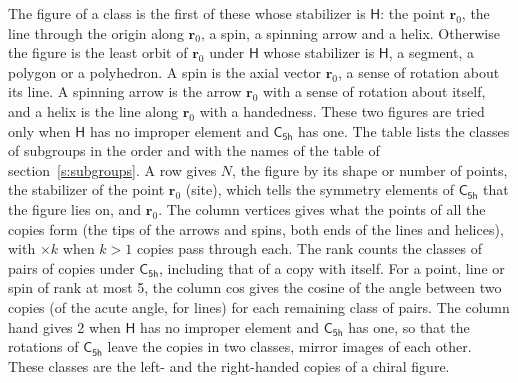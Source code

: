 \documentclass[10pt,a4paper]{article}
\numberwithin{equation}{section}
\newcommand{\grp}[1]{\mathsf{#1}}
\newcommand{\pointr}{\mathbf{r}}
\begin{document}
\leavevmode\label{n:head.figure}The figure of a class is the first of these whose stabilizer is $\grp{H}$: the point $\pointr_0$, the line through the origin along $\pointr_0$, a spin, a spinning arrow and a helix. Otherwise the figure is the least orbit of $\pointr_0$ under $\grp{H}$ whose stabilizer is $\grp{H}$, a segment, a polygon or a polyhedron. A spin is the axial vector $\pointr_0$, a sense of rotation about its line. A spinning arrow is the arrow $\pointr_0$ with a sense of rotation about itself, and a helix is the line along $\pointr_0$ with a handedness. These two figures are tried only when $\grp{H}$ has no improper element and $\grp{C_{5h}}$ has one. The table lists the classes of subgroups in the order and with the names of the table of section~\ref{s:subgroups}. \label{n:head.site}A row gives $N$, the figure by its shape or number of points, the stabilizer of the point $\pointr_0$ (site), which tells the symmetry elements of $\grp{C_{5h}}$ that the figure lies on, and $\pointr_0$. \label{n:head.vertices}The column vertices gives what the points of all the copies form (the tips of the arrows and spins, both ends of the lines and helices), with ${\times}k$ when $k > 1$ copies pass through each. \label{n:head.rank}The rank counts the classes of pairs of copies under $\grp{C_{5h}}$, including that of a copy with itself. \label{n:head.cos}For a point, line or spin of rank at most 5, the column cos gives the cosine of the angle between two copies (of the acute angle, for lines) for each remaining class of pairs. \label{n:head.hand}The column hand gives 2 when $\grp{H}$ has no improper element and $\grp{C_{5h}}$ has one, so that the rotations of $\grp{C_{5h}}$ leave the copies in two classes, mirror images of each other. These classes are the left- and the right-handed copies of a chiral figure.
\end{document}
